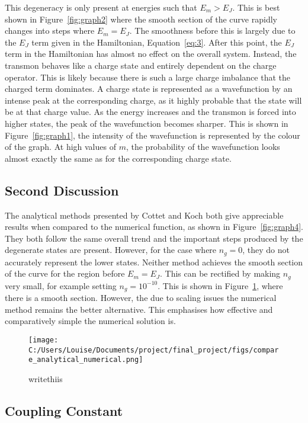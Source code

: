\documentclass[11pt]{article}
\begin{document}
This degeneracy is only present at energies such that $E_m > E_J$. This is best shown in Figure~\ref{fig:graph2} where the smooth section of the curve rapidly changes into steps where $E_m = E_J$. The smoothness before this is largely due to the $E_J$ term given in the Hamiltonian, Equation~\ref{eq:3}. After this point, the $E_J$ term in the Hamiltonian has almost no effect on the overall system. Instead, the transmon behaves like a charge state and entirely dependent on the charge operator. This is likely because there is such a large charge imbalance that the charged term dominates. A charge state is represented as a wavefunction by an intense peak at the corresponding charge, as it highly probable that the state will be at that charge value. As the energy increases and the transmon is forced into higher states, the peak of the wavefunction becomes sharper. This is shown in Figure~\ref{fig:graph1}, the intensity of the wavefunction is represented by the colour of the graph. At high values of $m$, the probability of the wavefunction looks almost exactly the same as for the corresponding charge state.

\subsection{Second Discussion}
The analytical methods presented by Cottet and Koch both give appreciable results when compared to the numerical function, as shown in Figure~\ref{fig:graph4}. They both follow the same overall trend and the important steps produced by the degenerate states are present. However, for the case where $n_g = 0$, they do not accurately represent the lower states. Neither method achieves the smooth section of the curve for the region before $E_m = E_J$. This can be rectified by making $n_g$ very small, for example setting $n_g = 10^{-10}$. This is shown in Figure~\ref{fig:graph6}, where there is a smooth section. However, the due to scaling issues the numerical method remains the better alternative. This emphasises how effective and comparatively simple the numerical solution is.

\begin{figure}[ht]
\centering
\texttt{[image: C:/Users/Louise/Documents/project/final\_project/figs/compare\_analytical\_numerical.png]}
\caption{writethiis}
\label{fig:graph6}
\end{figure}



\subsection{Coupling Constant}
\end{document}

